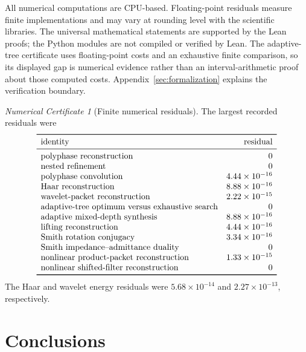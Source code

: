 \documentclass[11pt,a4paper]{article}
\theoremstyle{definition}
\theoremstyle{remark}
\newtheorem{certificate}[theorem]{Numerical Certificate}
\begin{document}
All numerical computations are CPU-based. Floating-point residuals measure finite implementations and may vary at rounding level with the scientific libraries. The universal mathematical statements are supported by the Lean proofs; the Python modules are not compiled or verified by Lean. The adaptive-tree certificate uses floating-point costs and an exhaustive finite comparison, so its displayed gap is numerical evidence rather than an interval-arithmetic proof about those computed costs. Appendix~\ref{sec:formalization} explains the verification boundary.

\begin{certificate}[Finite numerical residuals]\label{core:record:36}
The largest recorded residuals were
\[
\begin{array}{lr}
\toprule
\text{identity}&\text{residual}\\
\midrule
\text{polyphase reconstruction}&0\\
\text{nested refinement}&0\\
\text{polyphase convolution}&4.44\times10^{-16}\\
\text{Haar reconstruction}&8.88\times10^{-16}\\
\text{wavelet-packet reconstruction}&2.22\times10^{-15}\\
\text{adaptive-tree optimum versus exhaustive search}&0\\
\text{adaptive mixed-depth synthesis}&8.88\times10^{-16}\\
\text{lifting reconstruction}&4.44\times10^{-16}\\
\text{Smith rotation conjugacy}&3.34\times10^{-16}\\
\text{Smith impedance--admittance duality}&0\\
\text{nonlinear product-packet reconstruction}&1.33\times10^{-15}\\
\text{nonlinear shifted-filter reconstruction}&0\\
\bottomrule
\end{array}
\]
The Haar and wavelet energy residuals were $5.68\times10^{-14}$ and $2.27\times10^{-13}$, respectively.
\end{certificate}

\section{Conclusions}\label{core:section:17}
\end{document}
